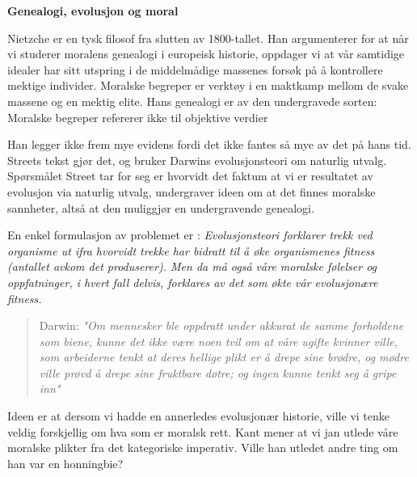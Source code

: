 \documentclass[11pt, a4paper]{article}
\newenvironment{sectionbox}[1][]{%
    \begin{sectionboxinner}
    \textbf{\large #1}
    \vspace{1pt}
    \newline
}{%
    \end{sectionboxinner}
}
\begin{document}
\begin{sectionbox}[Genealogi, evolusjon og moral]
\begin{flushleft}
    Nietzche er en tysk filosof fra slutten av 1800-tallet. Han argumenterer for at når vi studerer moralens genealogi i europeisk historie, oppdager vi at vår samtidige idealer har sitt utspring i de middelmådige massenes forsøk på å kontrollere mektige individer. Moralske begreper er verktøy i en maktkamp mellom de svake massene og en mektig elite. Hans genealogi er av den undergravede sorten: Moralske begreper refererer ikke til objektive verdier\newline

    Han legger ikke frem mye evidens fordi det ikke fantes så mye av det på hans tid. Streets tekst gjør det, og bruker Darwins evolusjonsteori om naturlig utvalg. Spørsmålet Street tar for seg er hvorvidt det faktum at vi er resultatet av evolusjon via naturlig utvalg, undergraver ideen om at det finnes moralske sannheter, altså at den muliggjør en undergravende genealogi.\newline

    En enkel formulasjon av problemet er : \textit{Evolusjonsteori forklarer trekk ved organisme ut ifra hvorvidt trekke har bidratt til å øke organismenes fitness (antallet avkom det produserer). Men da må også våre moralske følelser og oppfatninger, i hvert fall delvis, forklares av det som økte vår evolusjonære fitness.}\newline


    \begin{quote}
        Darwin: \textit{"Om mennesker ble oppdratt under akkurat de samme forholdene som biene, kunne det ikke være noen tvil om at våre ugifte kvinner ville, som arbeiderne tenkt at deres hellige plikt er å drepe sine brødre, og mødre ville prøvd å drepe sine fruktbare døtre; og ingen kunne tenkt seg å gripe inn"}
    \end{quote}
    Ideen er at dersom vi hadde en annerledes evolusjonær historie, ville vi tenke veldig forskjellig om hva som er moralsk rett. Kant mener at vi jan utlede våre moralske plikter fra det kategoriske imperativ. Ville han utledet andre ting om han var en honningbie?
\end{flushleft}
\end{sectionbox}
\end{document}
